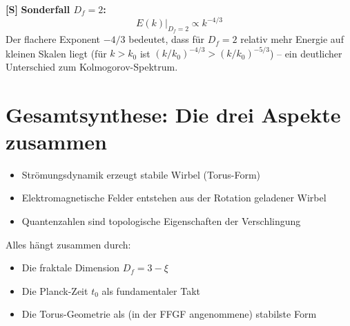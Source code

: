 	\textbf{[S]} \textbf{Sonderfall \(D_f = 2\):}
	\[
	E(k)\big|_{D_f=2} \propto k^{-4/3}
	\]
	Der flachere Exponent \(-4/3\) bedeutet, dass für $D_f = 2$ relativ mehr Energie auf kleinen Skalen liegt (für $k > k_0$ ist $(k/k_0)^{-4/3} > (k/k_0)^{-5/3}$) – ein deutlicher Unterschied zum Kolmogorov-Spektrum.
	
	\section{Gesamtsynthese: Die drei Aspekte zusammen}
	\begin{itemize}
		\item Strömungsdynamik erzeugt stabile Wirbel (Torus-Form)
		\item Elektromagnetische Felder entstehen aus der Rotation geladener Wirbel
		\item Quantenzahlen sind topologische Eigenschaften der Verschlingung
	\end{itemize}
	
	Alles hängt zusammen durch:
	\begin{itemize}
		\item Die fraktale Dimension \( D_f = 3 - \xi \)
		\item Die Planck-Zeit \( t_0 \) als fundamentaler Takt
		\item Die Torus-Geometrie als (in der FFGF angenommene) stabilste Form
	\end{itemize}
